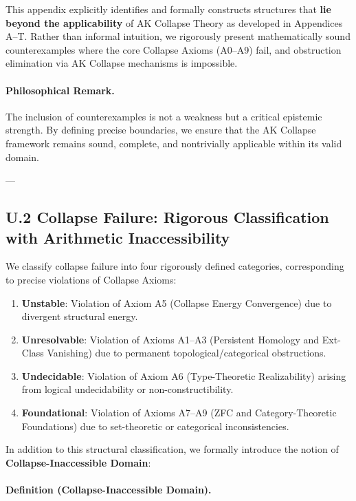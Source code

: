 \documentclass[11pt]{article}
\begin{document}
This appendix explicitly identifies and formally constructs structures that \textbf{lie beyond the applicability} of AK Collapse Theory as developed in Appendices A–T.  
Rather than informal intuition, we rigorously present mathematically sound counterexamples where the core Collapse Axioms (A0–A9) fail, and obstruction elimination via AK Collapse mechanisms is impossible.

\paragraph{Philosophical Remark.}  
The inclusion of counterexamples is not a weakness but a critical epistemic strength.  
By defining precise boundaries, we ensure that the AK Collapse framework remains sound, complete, and nontrivially applicable within its valid domain.

---

\subsection*{U.2 Collapse Failure: Rigorous Classification with Arithmetic Inaccessibility}

We classify collapse failure into four rigorously defined categories, corresponding to precise violations of Collapse Axioms:

\begin{enumerate}
    \item \textbf{Unstable}: Violation of Axiom A5 (Collapse Energy Convergence) due to divergent structural energy.
    \item \textbf{Unresolvable}: Violation of Axioms A1–A3 (Persistent Homology and Ext-Class Vanishing) due to permanent topological/categorical obstructions.
    \item \textbf{Undecidable}: Violation of Axiom A6 (Type-Theoretic Realizability) arising from logical undecidability or non-constructibility.
    \item \textbf{Foundational}: Violation of Axioms A7–A9 (ZFC and Category-Theoretic Foundations) due to set-theoretic or categorical inconsistencies.
\end{enumerate}

In addition to this structural classification, we formally introduce the notion of \textbf{Collapse-Inaccessible Domain}:

\paragraph{Definition (Collapse-Inaccessible Domain).}
\end{document}
